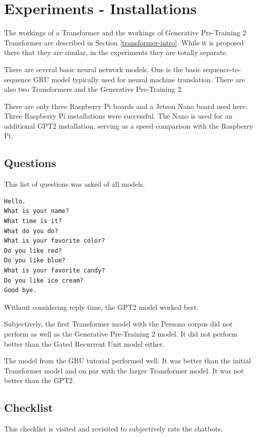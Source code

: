 

\section{Experiments - Installations}
The workings of a Transformer and the workings of Generative Pre-Training 2 Transformer are described in Section \ref{transformer-intro}. While it is proposed there that they are similar, in the experiments they are totally separate.

There are several basic neural network models. One is the basic sequence-to-sequence GRU model typically used for neural machine translation. There are also two Transformers and the Generative Pre-Training 2.  

There are only three Raspberry Pi boards and a Jetson Nano board used here. Three Raspberry Pi installations were successful. The Nano is used for an additional GPT2 installation, serving as a speed comparison with the Raspberry Pi. 


\subsection{Questions}
This list of questions was asked of all models. 

\begin{verbatim}
Hello.
What is your name? 
What time is it?
What do you do?
What is your favorite color?
Do you like red?
Do you like blue?
What is your favorite candy?
Do you like ice cream?
Good bye.
\end{verbatim}

Without considering reply time, the GPT2 model worked best. 

Subjectively, the first Transformer model with the Persona corpus did not perform as well as the Generative Pre-Training 2 model. It did not perform better than the Gated Recurrent Unit model either. 

The model from the GRU tutorial performed well. It was better than the initial Transformer model and on par with the larger Transformer model. It was not better than the GPT2.

\subsection{Checklist} 

This checklist is visited and revisited to subjectively rate the chatbots.

